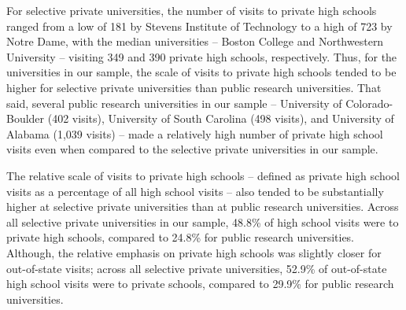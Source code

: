 \documentclass[
  12pt,
]{article}
\begin{document}
For selective private universities, the number of visits to private high schools ranged from a low of 181 by Stevens Institute of Technology to a high of 723 by Notre Dame, with the median universities -- Boston College and Northwestern University -- visiting 349 and 390 private high schools, respectively. Thus, for the universities in our sample, the scale of visits to private high schools tended to be higher for selective private universities than public research universities. That said, several public research universities in our sample -- University of Colorado-Boulder (402 visits), University of South Carolina (498 visits), and University of Alabama (1,039 visits) -- made a relatively high number of private high school visits even when compared to the selective private universities in our sample.

The relative scale of visits to private high schools -- defined as private high school visits as a percentage of all high school visits -- also tended to be substantially higher at selective private universities than at public research universities. Across all selective private universities in our sample, 48.8\% of high school visits were to private high schools, compared to 24.8\% for public research universities. Although, the relative emphasis on private high schools was slightly closer for out-of-state visits; across all selective private universities, 52.9\% of out-of-state high school visits were to private schools, compared to 29.9\% for public research universities.
\end{document}
